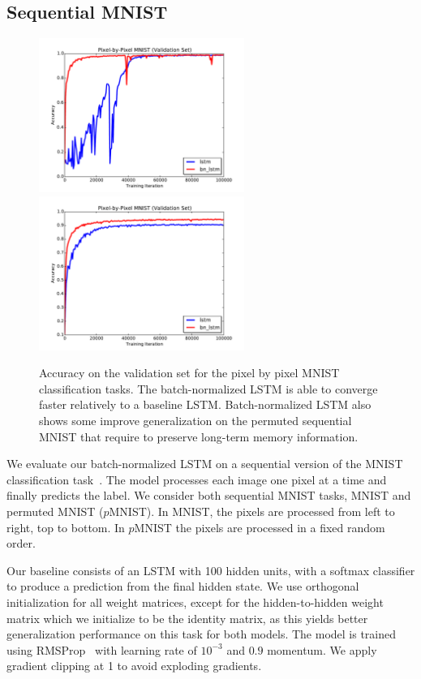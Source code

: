 \documentclass{article} %
\begin{document}
\subsection{Sequential MNIST}
\label{sec:seqmnist}

\begin{figure}
\center
\includegraphics[width=6.7cm]{figures/unpermuted_valid.pdf}
\includegraphics[width=6.7cm]{figures/permuted_valid.pdf}
\caption{Accuracy on the validation set for the pixel by pixel MNIST classification tasks. The batch-normalized LSTM is able to converge faster relatively to a baseline LSTM.
  Batch-normalized  LSTM also shows some improve generalization on the permuted sequential MNIST that require to preserve long-term memory information.}
\label{fig:seqmnist_valid}
\end{figure}


We evaluate our batch-normalized LSTM on a sequential version of the MNIST classification task~\cite{le2015simple}.
The model processes each image one pixel at a time and finally predicts the label.
We consider both sequential MNIST tasks, MNIST and permuted MNIST ($p$MNIST).
In MNIST, the pixels are processed from left to right, top to bottom.
In $p$MNIST the pixels are processed in a fixed random order.

Our baseline consists of an LSTM with 100 hidden units, with a softmax classifier to produce a prediction from the final hidden state.
We use orthogonal initialization for all weight matrices, except for the hidden-to-hidden weight matrix which we initialize to be the identity matrix,
as this yields better generalization performance on this task for both models.
The model is trained using RMSProp~\cite{rmsprop} with learning rate of $10^{-3}$ and $0.9$ momentum.
We apply gradient clipping at 1 to avoid exploding gradients.
\end{document}
